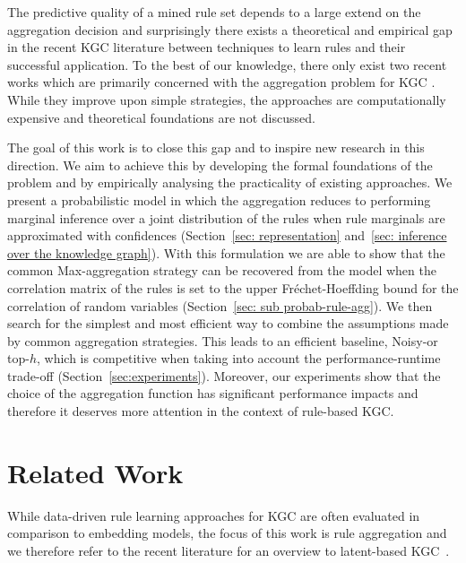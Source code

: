 \documentclass{article}
\theoremstyle{plain}
\theoremstyle{remark}
\begin{document}
The predictive quality of a mined rule set depends to a large extend on the aggregation decision and surprisingly there exists a theoretical and empirical gap in the recent KGC literature between techniques to learn rules and their successful application. To the best of our knowledge, there only exist two recent works which are primarily concerned with the aggregation problem for KGC \cite{ott2021safran,betz2022supervised}. While they improve upon simple strategies, the approaches are computationally expensive and theoretical foundations are not discussed.

The goal of this work is to close this gap and to inspire new research in this direction. We aim to achieve this by developing the formal foundations of the problem and by empirically analysing the practicality of existing approaches. We present a probabilistic model in which the aggregation reduces to performing marginal inference over a joint distribution of the rules when rule marginals are approximated with confidences (Section~\ref{sec: representation} and~\ref{sec: inference over the knowledge graph}). With this formulation we are able to show that the common Max-aggregation strategy can be recovered from the model when the correlation matrix of the rules is set to the upper Fréchet-Hoeffding bound for the correlation of random variables (Section~\ref{sec: sub probab-rule-agg}). We then search for the simplest and most efficient way to combine the assumptions made by common aggregation strategies. This leads to an efficient baseline, Noisy-or top-$h$, which  is competitive when taking into account the performance-runtime trade-off (Section~\ref{sec:experiments}). Moreover, our experiments show that the choice of the aggregation function has significant performance impacts and therefore it deserves more attention in the context of rule-based KGC.

\section{Related Work}
While data-driven rule learning approaches for KGC are often evaluated in comparison to embedding models, the focus of this work is rule aggregation and we therefore refer to the recent literature for an overview to latent-based KGC~\cite{rossi2020knowledge}.
\end{document}
